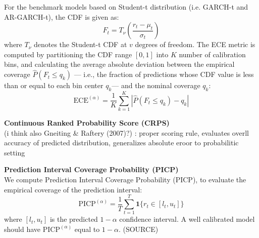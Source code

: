 For the benchmark models based on Student-t distribution (i.e. GARCH-t and AR-GARCH-t), the CDF is given as: 
\begin{equation}
    F_t = T_{\nu} \left( \frac{r_t - \mu_t}{\sigma_t} \right)
\end{equation}
where $T_{\nu}$ denotes the Student-t CDF at $v$ degrees of freedom.
The ECE metric is  computed by partitioning the CDF range $[0, 1]$ into $K$ number of calibration bins, and calculating the average absolute deviation between the empirical coverage $\hat{P}(F_t \leq q_k)$ — i.e., the fraction of predictions whose CDF value is less than or equal to each bin center $q_k$— and the nominal coverage $q_k$:
\begin{equation}
    \text{ECE}^{(\alpha)} = \frac{1}{K} \sum_{k=1}^{K} \left| \hat{P}(F_t \leq q_k) - q_k \right|
\end{equation}


\textbf{Continuous Ranked Probability Score (CRPS)} \\
(i think also Gneiting \& Raftery (2007)?) : 
proper scoring rule, evaluates overll accuracy of predicted distribution, generalizes absolute eroor to probabilitic setting


\textbf{Prediction Interval Coverage Probability (PICP)} \\
We compute Prediction Interval Coverage Probability (PICP), to evaluate the empirical coverage of the prediction interval:
\begin{equation}
    \text{PICP}^{(\alpha)} = \frac{1}{T} \sum_{t=1}^T \mathbf{1}\{r_t \in [l_t, u_t]\}
\end{equation}
where $[l_t, u_t]$ is the predicted $1-\alpha$ confidence interval. A well calibrated model should have $\text{PICP}^{(\alpha)}$ equal to $1-\alpha$. (SOURCE)


